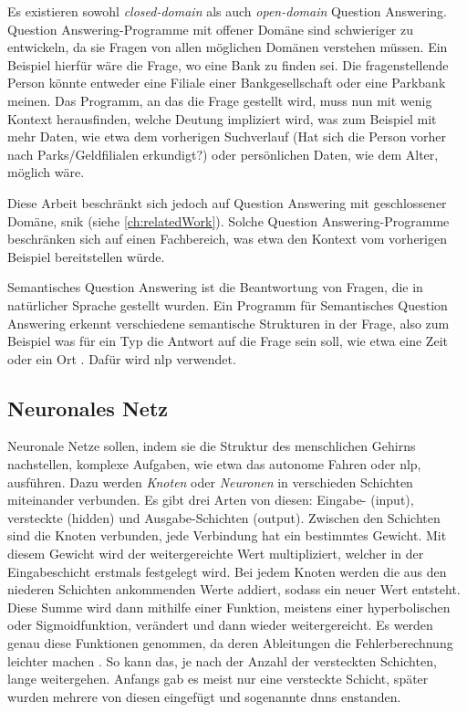 Es existieren sowohl \emph{closed-domain} als auch \emph{open-domain} Question Answering.
Question Answering-Programme mit offener Domäne sind schwieriger zu entwickeln,
da sie Fragen von allen möglichen Domänen verstehen müssen.
Ein Beispiel hierfür wäre die Frage, wo eine Bank zu finden sei.
Die fragenstellende Person könnte entweder eine Filiale einer Bankgesellschaft oder eine Parkbank meinen.
Das Programm, an das die Frage gestellt wird, muss nun mit wenig Kontext herausfinden,
welche Deutung impliziert wird, was zum Beispiel mit mehr Daten,
wie etwa dem vorherigen Suchverlauf (Hat sich die Person vorher nach Parks/Geldfilialen erkundigt?)
oder persönlichen Daten, wie dem Alter, möglich wäre.

Diese Arbeit beschränkt sich jedoch auf Question Answering mit geschlossener Domäne, \ac{snik} (siehe \cref{ch:relatedWork}).
Solche Question Answering-Programme beschränken sich auf einen Fachbereich,
was etwa den Kontext vom vorherigen Beispiel bereitstellen würde.

\begin{definition}
Semantisches Question Answering ist die Beantwortung von Fragen, die in natürlicher Sprache gestellt wurden.
Ein Programm für Semantisches Question Answering erkennt verschiedene semantische Strukturen in der Frage,
also zum Beispiel was für ein Typ die Antwort auf die Frage sein soll, wie etwa eine Zeit oder ein Ort \citep{sqadefinition}.
Dafür wird \acs{nlp} verwendet.
\end{definition}

\subsection{Neuronales Netz}

Neuronale Netze sollen, indem sie die Struktur des menschlichen Gehirns nachstellen, komplexe Aufgaben, wie etwa das autonome Fahren oder \ac{nlp}, ausführen.
Dazu werden \emph{Knoten} oder \emph{Neuronen} in verschieden Schichten miteinander verbunden.
Es gibt drei Arten von diesen: Eingabe- (input), versteckte (hidden) und Ausgabe-Schichten (output).
Zwischen den Schichten sind die Knoten verbunden, jede Verbindung hat ein bestimmtes Gewicht.
Mit diesem Gewicht wird der weitergereichte Wert multipliziert, welcher in der Eingabeschicht erstmals festgelegt wird.
Bei jedem Knoten werden die aus den niederen Schichten ankommenden Werte addiert, sodass ein neuer Wert entsteht.
Diese Summe wird dann mithilfe einer Funktion, meistens einer hyperbolischen oder Sigmoidfunktion, verändert und dann wieder weitergereicht.
Es werden genau diese Funktionen genommen, da deren Ableitungen die Fehlerberechnung leichter machen \citep{deeplearningarchitecturesreview}.
So kann das, je nach der Anzahl der versteckten Schichten, lange weitergehen.
Anfangs gab es meist nur eine versteckte Schicht, später wurden mehrere von diesen eingefügt und sogenannte \aclp{dnn} enstanden.

